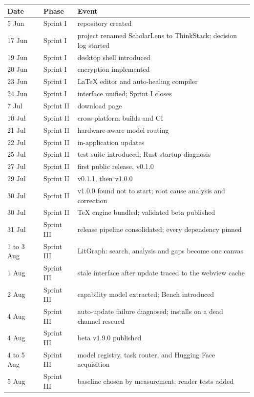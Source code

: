 \documentclass[11pt,a4paper]{article}
\begin{document}
\begin{center}
\small
\begin{tabularx}{\linewidth}{@{}llX@{}}
\toprule
\textbf{Date} & \textbf{Phase} & \textbf{Event} \\
\midrule
5 Jun & Sprint I & repository created \\
17 Jun & Sprint I & project renamed ScholarLens to ThinkStack; decision log started \\
19 Jun & Sprint I & desktop shell introduced \\
20 Jun & Sprint I & encryption implemented \\
23 Jun & Sprint I & LaTeX editor and auto-healing compiler \\
24 Jun & Sprint I & interface unified; Sprint I closes \\
7 Jul & Sprint II & download page \\
10 Jul & Sprint II & cross-platform builds and CI \\
21 Jul & Sprint II & hardware-aware model routing \\
22 Jul & Sprint II & in-application updates \\
25 Jul & Sprint II & test suite introduced; Rust startup diagnosis \\
27 Jul & Sprint II & first public release, v0.1.0 \\
29 Jul & Sprint II & v0.1.1, then v1.0.0 \\
30 Jul & Sprint II & v1.0.0 found not to start; root cause analysis and correction \\
30 Jul & Sprint II & TeX engine bundled; validated beta published \\
31 Jul & Sprint III & release pipeline consolidated; every dependency pinned \\
1 to 3 Aug & Sprint III & LitGraph: search, analysis and gaps become one canvas \\
1 Aug & Sprint III & stale interface after update traced to the webview cache \\
2 Aug & Sprint III & capability model extracted; Bench introduced \\
4 Aug & Sprint III & auto-update failure diagnosed; installs on a dead channel rescued \\
4 Aug & Sprint III & beta v1.9.0 published \\
4 to 5 Aug & Sprint III & model registry, task router, and Hugging Face acquisition \\
5 Aug & Sprint III & baseline chosen by measurement; render tests added \\
\bottomrule
\end{tabularx}
\end{center}
\end{document}
